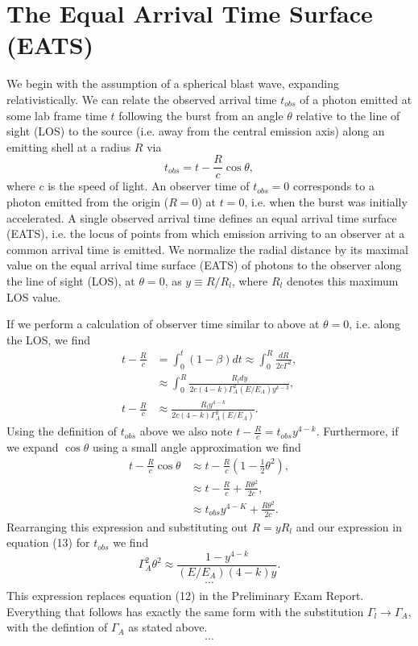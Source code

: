 \documentclass[11pt,twoside,letterpaper]{report}
\begin{document}
\section{The Equal Arrival Time Surface (EATS)}
We begin with the assumption of a spherical blast wave, expanding relativistically. We can relate the observed arrival time $t_{obs}$ of a photon emitted at some lab frame time $t$ following the burst from an angle $\theta$ relative to the line of sight (LOS) to the source (i.e. away from the central emission axis) along an emitting shell at a radius $R$ via
\begin{equation}
t_{obs} = t - \frac{R}{c}\cos \theta,
\end{equation}
where $c$ is the speed of light. An observer time of $t_{obs} = 0$ corresponds to a photon emitted from the origin ($R = 0$) at $t = 0$, i.e. when the burst was initially accelerated. A single observed arrival time defines an equal arrival time surface (EATS), i.e. the locus of points from which emission arriving to an observer at a common arrival time is emitted. We normalize the radial distance by its maximal value on the equal arrival time surface (EATS) of photons to the observer along the line of sight (LOS), at $\theta = 0$, as $y \equiv R/R_l$, where $R_l$ denotes this maximum LOS value.

If we perform a calculation of observer time similar to above at $\theta = 0$, i.e. along the LOS, we find
\begin{align}
t - \frac{R}{c} &= \int_0^t \left( 1 - \beta \right) dt \approx \int_0^R \frac{dR}{2c \Gamma^2}, \\
&\approx \int_0^R \frac{R_l dy}{2c(4-k) \Gamma_A^2 (E/E_A) y^{k-3}}, \\
t - \frac{R}{c} &\approx \frac{R_l y^{4-k}}{2c(4-k)\Gamma_A^2 (E/E_A)}.
\end{align}
Using the definition of $t_{obs}$ above we also note $t - \frac{R}{c}  = t_{obs}y^{4-k}$. Furthermore, if we expand $\cos \theta$ using a small angle approximation we find
\begin{align}
t - \frac{R}{c}\cos \theta &\approx t - \frac{R}{c}\left( 1 - \frac{1}{2}\theta^2 \right), \\
&\approx t - \frac{R}{c} + \frac{R\theta^2}{2c}, \\
&\approx t_{obs}y^{4-K}  + \frac{R\theta^2}{2c}.
\end{align}
Rearranging this expression and substituting out $R = yR_l$ and our expression in equation (13) for $t_{obs}$ we find
\begin{equation}
\Gamma_A^2 \theta^2 \approx \frac{1 - y^{4-k}}{(E/E_A)(4-k)y}.
\end{equation}
\begin{align*}
\cdots
\end{align*}
This expression replaces equation (12) in the Preliminary Exam Report. Everything that follows has exactly the same form with the substitution $\Gamma_l \rightarrow \Gamma_A$, with the defintion of $\Gamma_A$ as stated above.
\begin{align*}
\cdots
\end{align*}
\end{document}
